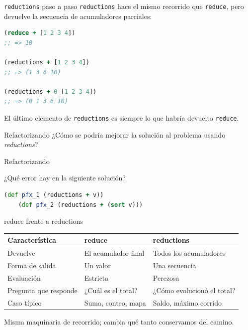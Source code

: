 \documentclass{beamer}
\begin{document}
\begin{frame}[fragile]{\texttt{reductions} paso a paso}
    \texttt{reductions} hace el mismo recorrido que \texttt{reduce}, pero devuelve la secuencia de acumuladores parciales:

    \begin{lstlisting}[language=Clojure]
(reduce + [1 2 3 4])
;; => 10

(reductions + [1 2 3 4])
;; => (1 3 6 10)

(reductions + 0 [1 2 3 4])
;; => (0 1 3 6 10)
    \end{lstlisting}

    \vspace{0.2cm}
    El último elemento de \texttt{reductions} es siempre lo que habría devuelto \texttt{reduce}.
\end{frame}

\begin{frame}[fragile]{Refactorizando}
    ¿Cómo se podría mejorar la solución al problema usando \textit{reductions}?
\end{frame}

\begin{frame}[fragile]{Refactorizando}
    
    ¿Qué error hay en la siguiente solución?

    \begin{lstlisting}[language=Clojure]
    (def pfx_1 (reductions + v))
    (def pfx_2 (reductions + (sort v)))
    \end{lstlisting}


\end{frame}

\begin{frame}[fragile]{reduce frente a reductions}
\begin{table}[h!]
\centering
\scriptsize
\begin{tabular}{|l|l|l|}
\hline
\textbf{Característica} & \textbf{reduce} & \textbf{reductions} \\ \hline
Devuelve & El acumulador final & Todos los acumuladores \\ \hline
Forma de salida & Un valor & Una secuencia \\ \hline
Evaluación & Estricta & Perezosa \\ \hline
Pregunta que responde & ¿Cuál es el total? & ¿Cómo evolucionó el total? \\ \hline
Caso típico & Suma, conteo, mapa & Saldo, máximo corrido \\ \hline
\end{tabular}
\end{table}
\vspace{0.2cm}
\begin{center}
\small Misma maquinaria de recorrido; cambia qué tanto conservamos del camino.
\end{center}
\end{frame}
\end{document}

